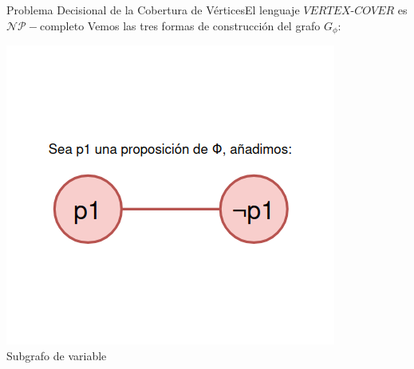 \documentclass[10pt, envcountsect, presentation, aspectratio=169]{beamer}
\begin{document}
\begin{frame}{Problema Decisional de la Cobertura de Vértices}{El lenguaje $VERTEX\text{-}COVER$ es $\mathcal{NP}-$completo}
    \centering
    Vemos las tres formas de construcción del grafo $G_\phi$:
    
    \begin{minipage}{0.32\textwidth}
        \centering
        \includegraphics[width=\linewidth]{images/image.png}
        \\\small Subgrafo de variable
        

\end{minipage}
\end{frame}
\end{document}
